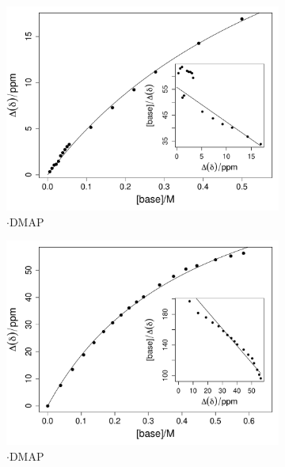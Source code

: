 \begin{refsection}
\begin{figure}
  \centering
  \begin{subfigure}{0.45\linewidth}
    \includegraphics[width=\linewidth]{Figures/nmr-titration/bn-ebs-dmap.pdf}
    \caption{$ \cdot $DMAP}
  \end{subfigure}
  \begin{subfigure}{0.45\linewidth}
    \includegraphics[width=\linewidth]{Figures/nmr-titration/4oet-ebs-dmap.pdf}
    \caption{$ \cdot $DMAP}
  \end{subfigure}
  \begin{subfigure}{0.45\linewidth}

\end{subfigure}
\end{figure}
\end{refsection}
